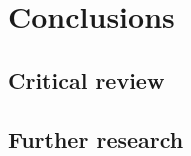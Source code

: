 \chapter{Conclusions}                       \label{chap:concl}

\section{Critical review}   


\section{Further research}
%
